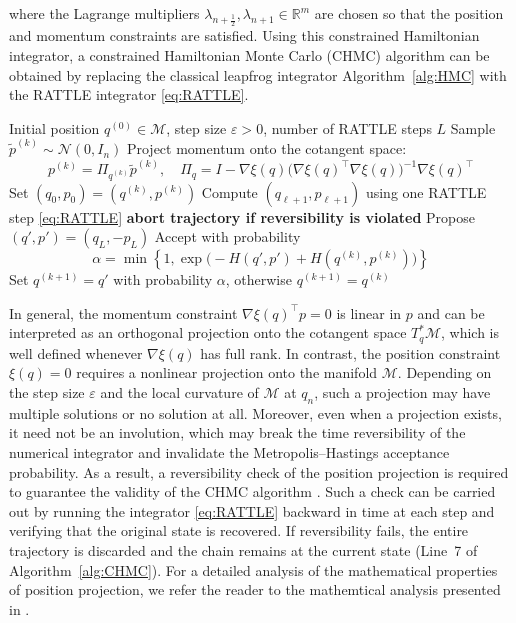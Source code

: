 \documentclass[12pt]{article}
\begin{document}
where the Lagrange multipliers $\lambda_{n+\frac12}, \lambda_{n+1} \in \mathbb{R}^m$
are chosen so that the position and momentum constraints are satisfied. Using this constrained Hamiltonian integrator, a constrained Hamiltonian Monte Carlo
(CHMC) algorithm can be obtained by replacing the classical leapfrog integrator Algorithm~\ref{alg:HMC} with the RATTLE integrator \eqref{eq:RATTLE}.
\begin{algorithm}[htbp]
\caption{Constrained Hamiltonian Monte Carlo}
\label{alg:CHMC}
\begin{algorithmic}[1]
\Require Initial position $q^{(0)} \in \mathcal{M}$,
step size $\varepsilon > 0$,
number of RATTLE steps $L$
    \State Sample $\tilde p^{(k)} \sim \mathcal{N}(0,I_n)$
    \State Project momentum onto the cotangent space:
    \begin{equation}\label{mproj}
    p^{(k)} = \Pi_{q^{(k)}} \tilde p^{(k)}, 
    \quad
    \Pi_q = I - \nabla \xi(q)
    \bigl(\nabla \xi(q)^\top \nabla \xi(q)\bigr)^{-1}
    \nabla \xi(q)^\top
    \end{equation}
    \State Set $(q_0,p_0)=(q^{(k)},p^{(k)})$
        \State Compute $(q_{\ell+1},p_{\ell+1})$
        using one RATTLE step \eqref{eq:RATTLE}
        \State \textbf{abort trajectory if reversibility is violated}
    \EndFor
    \State Propose $(q',p')=(q_L,-p_L)$
    \State Accept with probability
    \[
    \alpha = \min\left\{
    1,
    \exp\bigl(
    -H(q',p') + H(q^{(k)},p^{(k)})
    \bigr)
    \right\}
    \]
    \State Set $q^{(k+1)} = q'$ with probability $\alpha$,
    otherwise $q^{(k+1)} = q^{(k)}$
\EndFor
\end{algorithmic}
\end{algorithm}
In general, the momentum constraint $\nabla \xi(q)^\top p = 0$ is linear in $p$ and
can be interpreted as an orthogonal projection onto the cotangent space
$T^*_{q}\mathcal{M}$, which is well defined whenever $\nabla \xi(q)$ has full
rank. In contrast, the position constraint $\xi(q) = 0$ requires a nonlinear
projection onto the manifold $\mathcal{M}$. Depending on the step size $\varepsilon$
and the local curvature of $\mathcal{M}$ at $q_n$, such a projection may have multiple
solutions or no solution at all. Moreover, even when a projection exists, it need not
be an involution, which may break the time reversibility of the numerical integrator
and invalidate the Metropolis--Hastings acceptance probability.
As a result, a reversibility check of the position projection is required to guarantee the validity of the CHMC algorithm \citep{M5}. Such a check can be carried out by running the integrator \eqref{eq:RATTLE} backward in time at each step and verifying that the original state is recovered. If reversibility fails, the entire trajectory is discarded and the chain remains at the current state (Line~7 of Algorithm~\ref{alg:CHMC}). For a detailed
analysis of the mathematical properties of position projection, we refer the reader to the mathemtical analysis presented in \citet{M4}.
\end{document}
